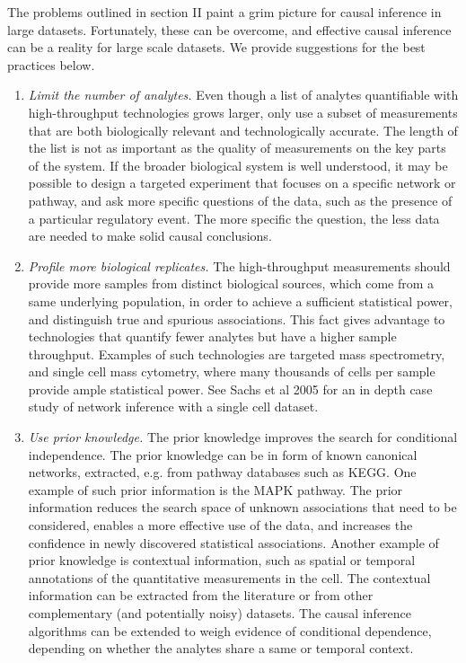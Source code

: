\documentclass[journal=jacsat,manuscript=article]{achemso}
\begin{document}
The problems outlined in section II paint a grim picture for causal inference in large datasets. Fortunately, these can be overcome, and effective causal inference can be a reality for large scale datasets.  We provide suggestions for the best practices below.


\begin{enumerate}
\item \textit{Limit the number of analytes.} Even though a list of analytes quantifiable with high-throughput technologies grows larger, only use a subset of measurements that are both biologically relevant and technologically accurate. The length of the list is not as important as the quality of measurements on the key parts of the system.  If the broader biological system is well understood, it may be possible to design a targeted experiment that focuses on a specific network or pathway, and ask more specific questions of the data, such as the presence of a particular regulatory event.  The more specific the question, the less data are needed to make solid causal conclusions.  

\item \textit{Profile more biological replicates.}  The high-throughput measurements should provide more samples from distinct biological sources, which come from a same underlying population, in order to achieve a sufficient statistical power, and distinguish true and spurious associations.  This fact gives advantage to technologies that quantify fewer analytes but have a higher sample throughput. Examples of such technologies are targeted mass spectrometry, and single cell mass cytometry, where  many thousands of cells per sample provide ample statistical power. See Sachs et al 2005 for an in depth case study of network inference with a single cell dataset. \cite{sachs2005causal}

\item \textit{Use prior knowledge.} The prior knowledge improves the search for conditional independence. The prior knowledge can be in form of known canonical networks, extracted, e.g. from pathway databases such as KEGG. One example of such prior information is the MAPK pathway. The prior information reduces the search space of unknown associations that need to be considered, enables a more effective use of the data, and increases the confidence in newly discovered statistical associations.  Another example of prior knowledge is contextual information, such as spatial or temporal annotations of the quantitative measurements in the cell. The contextual information can be extracted from the literature or from other complementary (and potentially noisy) datasets. The causal inference algorithms can be extended to weigh evidence of conditional dependence, depending on whether the analytes share a same or temporal context. 


\end{enumerate}
\end{document}
